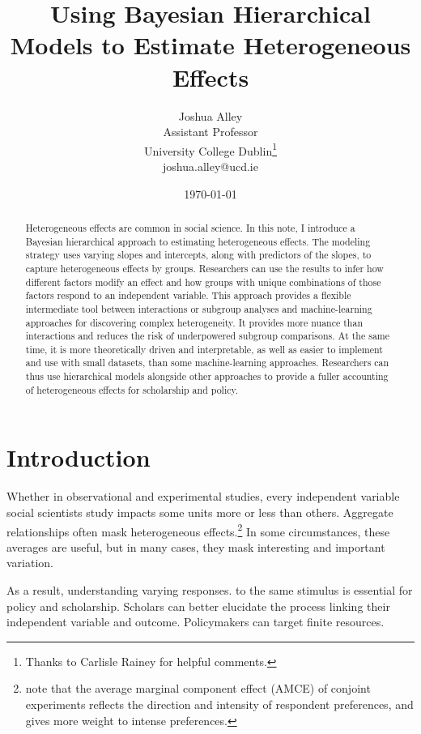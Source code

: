 \documentclass[12pt]{article}
\title{\textbf{Using Bayesian Hierarchical Models to Estimate Heterogeneous Effects}}
\author{Joshua Alley \\
Assistant Professor \\
University College Dublin\thanks{Thanks to Carlisle Rainey for helpful comments.} \\
joshua.alley@ucd.ie
}
\date{\today}
\begin{document}
\maketitle 

\begin{abstract} 
Heterogeneous effects are common in social science. 
In this note, I introduce a Bayesian hierarchical approach to estimating heterogeneous effects. 
The modeling strategy uses varying slopes and intercepts, along with predictors of the slopes, to capture heterogeneous effects by groups.  
Researchers can use the results to infer how different factors modify an effect and how groups with unique combinations of those factors respond to an independent variable. 
This approach provides a flexible intermediate tool between interactions or subgroup analyses and machine-learning approaches for discovering complex heterogeneity. 
It provides more nuance than interactions and reduces the risk of underpowered subgroup comparisons.
At the same time, it is more theoretically driven and interpretable, as well as easier to implement and use with small datasets, than some machine-learning approaches. 
Researchers can thus use hierarchical models alongside other approaches to provide a fuller accounting of heterogeneous effects for scholarship and policy.
\end{abstract} 


\newpage 
\doublespace 


\section{Introduction}


Whether in observational and experimental studies, every independent variable social scientists study impacts some units more or less than others. 
Aggregate relationships often mask heterogeneous effects.\footnote{\citet{Abramsonetal2022} note that the average marginal component effect (AMCE) of conjoint experiments reflects the direction and intensity of respondent preferences, and gives more weight to intense preferences.} 
In some circumstances, these averages are useful, but in many cases, they mask interesting and important variation. 


As a result, understanding varying responses. to the same stimulus is essential for policy and scholarship. 
Scholars can better elucidate the process linking their independent variable and outcome.
Policymakers can target finite resources. 
\end{document}

